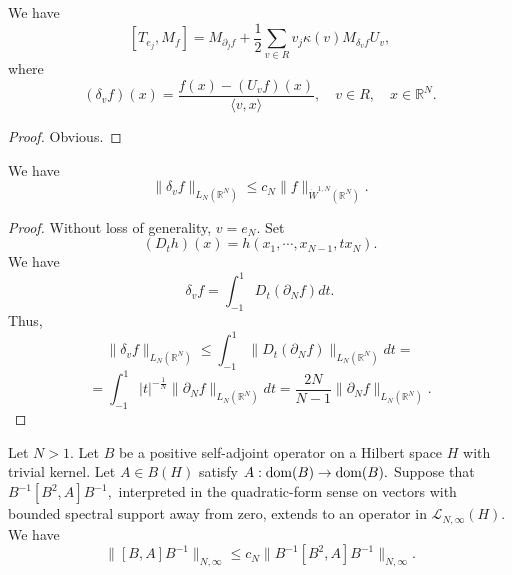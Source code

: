\documentclass{amsart}
\begin{document}
\begin{lemma}\label{tj commutator fact} We have
$$[T_{e_j},M_f]=M_{\partial_jf}+\frac12\sum_{v\in R}v_j\kappa(v)M_{\delta_vf}U_v,$$
where
$$(\delta_vf)(x)=\frac{f(x)-(U_vf)(x)}{\langle v,x\rangle},\quad v\in R,\quad x\in\mathbb{R}^N.$$
\end{lemma}
\begin{proof} Obvious.
\end{proof}

\begin{lemma}\label{deltav estimate} We have
$$\|\delta_vf\|_{L_N(\mathbb{R}^N)}\leq c_N\|f\|_{\dot{W}^{1,N}(\mathbb{R}^N)}.$$
\end{lemma}
\begin{proof} Without loss of generality, $v=e_N.$ Set
$$(D_th)(x)=h(x_1,\cdots,x_{N-1},tx_N).$$
We have
$$\delta_vf=\int_{-1}^1D_t(\partial_Nf)dt.$$
Thus,
$$\|\delta_vf\|_{L_N(\mathbb{R}^N)}\leq\int_{-1}^1\|D_t(\partial_Nf)\|_{L_N(\mathbb{R}^N)}dt=$$
$$=\int_{-1}^1|t|^{-\frac1N}\|\partial_Nf\|_{L_N(\mathbb{R}^N)}dt=\frac{2N}{N-1}\|\partial_Nf\|_{L_N(\mathbb{R}^N)}.$$
\end{proof}

\begin{lemma}\label{from doi lemma} Let $N>1.$ Let $B$ be a positive self-adjoint operator on a Hilbert space $H$ with trivial kernel. Let $A\in B(H)$ satisfy $A:{\rm dom}(B)\to{\rm dom}(B).$ Suppose that $B^{-1}[B^2,A]B^{-1},$ interpreted in the quadratic-form sense on vectors with bounded spectral support away from zero, extends to an operator in $\mathcal{L}_{N,\infty}(H).$ We have
$$\|[B,A]B^{-1}\|_{N,\infty}\leq c_N\|B^{-1}[B^2,A]B^{-1}\|_{N,\infty}.$$
\end{lemma}
\end{document}
